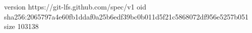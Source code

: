version https://git-lfs.github.com/spec/v1
oid sha256:2065797a4e60fb1ddaf0a25b6edf39bc0b011d5f21c5868072df956e5257b051
size 103138
